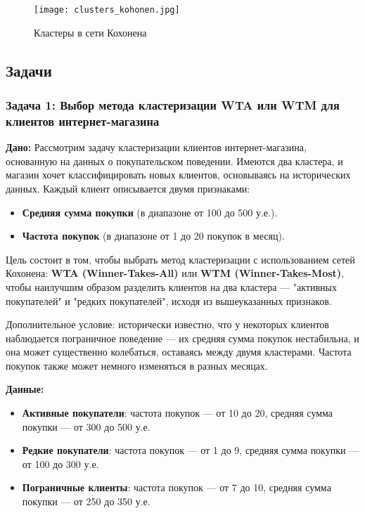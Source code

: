 \begin{itemize}
\begin{figure}[h]
\centering
\texttt{[image: clusters\_kohonen.jpg]}
\caption{Кластеры в сети Кохонена}
\end{figure}

\subsection{Задачи}
\subsubsection{Задача 1: Выбор метода кластеризации WTA или WTM для клиентов интернет-магазина}

\textbf{Дано:}
Рассмотрим задачу кластеризации клиентов интернет-магазина, основанную на данных о покупательском поведении. Имеются два кластера, и магазин хочет классифицировать новых клиентов, основываясь на исторических данных. Каждый клиент описывается двумя признаками: 

\begin{itemize}
    \item \textbf{Средняя сумма покупки} (в диапазоне от 100 до 500 у.е.).
    \item \textbf{Частота покупок} (в диапазоне от 1 до 20 покупок в месяц).
\end{itemize}

Цель состоит в том, чтобы выбрать метод кластеризации с использованием сетей Кохонена: \textbf{WTA (Winner-Takes-All)} или \textbf{WTM (Winner-Takes-Most)}, чтобы наилучшим образом разделить клиентов на два кластера — "активных покупателей" и "редких покупателей", исходя из вышеуказанных признаков.

Дополнительное условие: исторически известно, что у некоторых клиентов наблюдается пограничное поведение — их средняя сумма покупок нестабильна, и она может существенно колебаться, оставаясь между двумя кластерами. Частота покупок также может немного изменяться в разных месяцах.

\textbf{Данные:}
\begin{itemize}
    \item \textbf{Активные покупатели}: частота покупок — от 10 до 20, средняя сумма покупки — от 300 до 500 у.е.
    \item \textbf{Редкие покупатели}: частота покупок — от 1 до 9, средняя сумма покупки — от 100 до 300 у.е.
    \item \textbf{Пограничные клиенты}: частота покупок — от 7 до 10, средняя сумма покупки — от 250 до 350 у.е.
\end{itemize}


\end{itemize}

